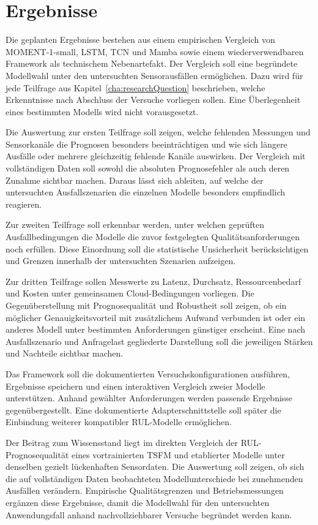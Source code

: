 

\chapter{Ergebnisse}

Die geplanten Ergebnisse bestehen aus einem empirischen Vergleich von MOMENT-1-small, \ac{LSTM}, \ac{TCN} und Mamba sowie einem wiederverwendbaren Framework als technischem Nebenartefakt. Der Vergleich soll eine begründete Modellwahl unter den untersuchten Sensorausfällen ermöglichen. Dazu wird für jede Teilfrage aus Kapitel~\ref{cha:researchQuestion} beschrieben, welche Erkenntnisse nach Abschluss der Versuche vorliegen sollen. Eine Überlegenheit eines bestimmten Modells wird nicht vorausgesetzt.

Die Auswertung zur ersten Teilfrage soll zeigen, welche fehlenden Messungen und Sensorkanäle die Prognosen besonders beeinträchtigen und wie sich längere Ausfälle oder mehrere gleichzeitig fehlende Kanäle auswirken. Der Vergleich mit vollständigen Daten soll sowohl die absoluten Prognosefehler als auch deren Zunahme sichtbar machen. Daraus lässt sich ableiten, auf welche der untersuchten Ausfallszenarien die einzelnen Modelle besonders empfindlich reagieren.

Zur zweiten Teilfrage soll erkennbar werden, unter welchen geprüften Ausfallbedingungen die Modelle die zuvor festgelegten Qualitätsanforderungen noch erfüllen. Diese Einordnung soll die statistische Unsicherheit berücksichtigen und Grenzen innerhalb der untersuchten Szenarien aufzeigen.

Zur dritten Teilfrage sollen Messwerte zu Latenz, Durchsatz, Ressourcenbedarf und Kosten unter gemeinsamen Cloud-Bedingungen vorliegen. Die Gegenüberstellung mit Prognosequalität und Robustheit soll zeigen, ob ein möglicher Genauigkeitsvorteil mit zusätzlichem Aufwand verbunden ist oder ein anderes Modell unter bestimmten Anforderungen günstiger erscheint. Eine nach Ausfallszenario und Anfragelast gegliederte Darstellung soll die jeweiligen Stärken und Nachteile sichtbar machen.

Das Framework soll die dokumentierten Versuchskonfigurationen ausführen, Ergebnisse speichern und einen interaktiven Vergleich zweier Modelle unterstützen. Anhand gewählter Anforderungen werden passende Ergebnisse gegenübergestellt. Eine dokumentierte Adapterschnittstelle soll später die Einbindung weiterer kompatibler \ac{RUL}-Modelle ermöglichen.

Der Beitrag zum Wissensstand liegt im direkten Vergleich der \ac{RUL}-Prognosequalität eines vortrainierten \ac{TSFM} und etablierter Modelle unter denselben gezielt lückenhaften Sensordaten. Die Auswertung soll zeigen, ob sich die auf vollständigen Daten beobachteten Modellunterschiede bei zunehmenden Ausfällen verändern. Empirische Qualitätsgrenzen und Betriebsmessungen ergänzen diese Ergebnisse, damit die Modellwahl für den untersuchten Anwendungsfall anhand nachvollziehbarer Versuche begründet werden kann.
